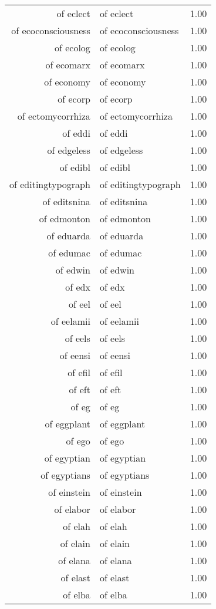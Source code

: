 \begin{table}[ht]
\begin{tabular}{rlr}
  of eclect & of eclect & 1.00 \\ 
  of ecoconsciousness & of ecoconsciousness & 1.00 \\ 
  of ecolog & of ecolog & 1.00 \\ 
  of ecomarx & of ecomarx & 1.00 \\ 
  of economy & of economy & 1.00 \\ 
  of ecorp & of ecorp & 1.00 \\ 
  of ectomycorrhiza & of ectomycorrhiza & 1.00 \\ 
  of eddi & of eddi & 1.00 \\ 
  of edgeless & of edgeless & 1.00 \\ 
  of edibl & of edibl & 1.00 \\ 
  of editingtypograph & of editingtypograph & 1.00 \\ 
  of editsnina & of editsnina & 1.00 \\ 
  of edmonton & of edmonton & 1.00 \\ 
  of eduarda & of eduarda & 1.00 \\ 
  of edumac & of edumac & 1.00 \\ 
  of edwin & of edwin & 1.00 \\ 
  of edx & of edx & 1.00 \\ 
  of eel & of eel & 1.00 \\ 
  of eelamii & of eelamii & 1.00 \\ 
  of eels & of eels & 1.00 \\ 
  of eensi & of eensi & 1.00 \\ 
  of efil & of efil & 1.00 \\ 
  of eft & of eft & 1.00 \\ 
  of eg & of eg & 1.00 \\ 
  of eggplant & of eggplant & 1.00 \\ 
  of ego & of ego & 1.00 \\ 
  of egyptian & of egyptian & 1.00 \\ 
  of egyptians & of egyptians & 1.00 \\ 
  of einstein & of einstein & 1.00 \\ 
  of elabor & of elabor & 1.00 \\ 
  of elah & of elah & 1.00 \\ 
  of elain & of elain & 1.00 \\ 
  of elana & of elana & 1.00 \\ 
  of elast & of elast & 1.00 \\ 
  of elba & of elba & 1.00 \\ 

\end{tabular}
\end{table}

